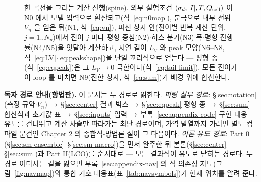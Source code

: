 \begin{figure}[t]
\caption{한 곡선을 그리는 계산 진행(spine). 외부 실험조건 $(\sigma_d,|I|,T,Q_{\mathrm{cell}})$
이 N0 에서 모델 입력으로 환산되고(식~\eqref{eq:n0map}), 분극으로 내부 전위 $V_n$ 을 얻은 뒤(N1,
식~\eqref{eq:vn}), 파선 상자 안(전이별 반복 계산 단위, $j=1..N_p$)에서 전이 $j$ 마다 평형 중심(N2)$\cdot$히스
분기(N3)$\cdot$폭$\cdot$평형 진행률(N4/N5)을 잇달아 계산하고, 지연 길이 $L_V$ 와 peak 모양(N6--N8,
식~\eqref{eq:LV}$\cdot$\eqref{eq:peakshape})을 단일 꼬리식으로 얻는다 --- 평형 종(식~\eqref{eq:eqpeak})은 그 $L_V\!\to\!0$ 극한이다(식~\eqref{eq:tail-limit}).
모든 전이가 이 loop 를 마치면 N9(진한 상자, 식~\eqref{eq:sum})가 배경 위에 합산한다.}
\label{fig:spine}
\end{figure}

\tableofcontents
\newpage

\ifnavaid
\begin{keybox}
\textbf{독자 경로 안내(항법판).} 이 문서는 두 경로로 읽힌다. \emph{피팅 실무 경로}: \S\ref{sec:notation}
(측정 규약$\cdot$$V_n$)$\,\to\,$\S\ref{sec:center} 결과 박스$\,\to\,$\S\ref{sec:eqpeak} 평형
종$\,\to\,$\S\ref{sec:sum} 합산식과 초기값 표$\,\to\,$\S\ref{sec:inputs} 입력$\,\to\,$부록~\ref{sec:appendix-code}
구현 대응 --- 유도를 건너뛰고 계산 사슬만 따라가는 최단 경로이며, 가역 발열까지 가려면 별도 컴파일
문건인 Chapter 2 의 종합식$\cdot$방법론 절이 그 다음이다. \emph{이론 유도 경로}: Part 0
(\S\ref{sec:sm-ensemble}--\S\ref{sec:sm-macro})을 먼저 완주한 뒤 본론(\S\ref{sec:center}--\S\ref{sec:sum})과
Part II(LCO)를 순서대로 --- 모든 결과식이 유도로 닫히는 경로다. 두 경로 어디서든 길을 잃으면
부록~\ref{sec:appendix-nav} 의 식 의존성 지도(그림~\ref{fig:navmap})와 통합 기호
대응표(표~\ref{tab:navsymbols})가 현재 위치를 알려 준다.
\end{keybox}
\fi

